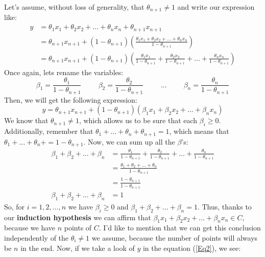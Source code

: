 \documentclass[12pt, oneside]{article}%
\begin{document}
\begin{enumerate}[font=\bfseries]
\begin{itemize}
    Let's assume, without loss of generality, that $\theta_{n+1}\neq1$ and write our expression like:
    \begin{align*}
        y&=\theta_1x_1+ \theta_2x_2+\dots+  \theta_{n}x_{n} +\theta_{n+1}x_{n+1} \\
        &=\theta_{n+1}x_{n+1}+(1-\theta_{n+1})\left(\frac{\theta_1x_1+ \theta_2x_2+\dots+\theta_{n}x_{n}}{1-\theta_{n+1}}\right)\\
        &=\theta_{n+1}x_{n+1}+(1-\theta_{n+1})\left(\frac{\theta_1x_1}{1-\theta_{n+1}}+\frac{\theta_2x_2}{1-\theta_{n+1}} +\dots+\frac{\theta_n x_n}{1-\theta_{n+1}}\right)
    \end{align*}
    Once again, lets rename the variables:
    $$\beta_1=\frac{\theta_1}{1-\theta_{n+1}} \hspace{1cm} \beta_2=\frac{\theta_2}{1-\theta_{n+1}} \hspace{1cm} \dots \hspace{1cm} \beta_n=\frac{\theta_n}{1-\theta_{n+1}} $$
    Then, we will get the following expression: 
    \begin{equation}
        y = \theta_{n+1}x_{n+1}+(1-\theta_{n+1})\left(\beta_1x_1 + \beta_2x_2+\dots+\beta_n x_n \right)
        \label{Eq2}
    \end{equation}
    We know that $\theta_{n+1}\neq1$, which allows us to be sure that each $\beta_i\geq0$. Additionally, remember that $\theta_1 + \dots + \theta_{n} + \theta_{n+1} = 1$, which means that $\theta_1 + \dots + \theta_{n} +  = 1 -\theta_{n+1}$. Now, we can sum up all the $\beta$'s:
    \begin{align*}
        \beta_1+\beta_2+\dots+\beta_n&=\frac{\theta_1}{1-\theta_{n+1}}+\frac{\theta_2}{1-\theta_{n+1}}+\dots+\frac{\theta_n}{1-\theta_{n+1}}\\
        &=\frac{\theta_1+\theta_2+\dots+\theta_n}{1-\theta_{n+1}}\\
        &=\frac{1-\theta_{n+1}}{1-\theta_{n+1}}\\
        \beta_1+\beta_2+\dots+\beta_n&=1
    \end{align*}
    So, for $i=1,2,\dots,n$ we have $\beta_i\geq0$ and $\beta_1+\beta_2+\dots+\beta_n=1$. Thus, thanks to our \textbf{induction hypothesis} we can affirm that $\beta_1x_1 + \beta_2x_2+\dots+\beta_n x_n \in C$, because we have $n$ points of $C$. I'd like to mention that we can get this conclusion independently of the $\theta_i\neq1$ we assume, because the number of points will always be $n$ in the end. Now, if we take a look of $y$ in the equation (\ref{Eq2}), we see:

\end{itemize}
\end{enumerate}
\end{document}
